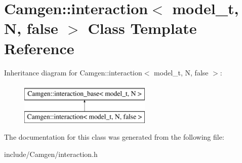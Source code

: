 \hypertarget{a00314}{}\section{Camgen\+:\+:interaction$<$ model\+\_\+t, N, false $>$ Class Template Reference}
\label{a00314}
Inheritance diagram for Camgen\+:\+:interaction$<$ model\+\_\+t, N, false $>$\+:\begin{figure}[H]
\begin{center}
\leavevmode
\includegraphics[height=2.000000cm]{a00314}
\end{center}
\end{figure}


The documentation for this class was generated from the following file\+:\begin{DoxyCompactItemize}
\item 
include/\+Camgen/interaction.\+h\end{DoxyCompactItemize}
